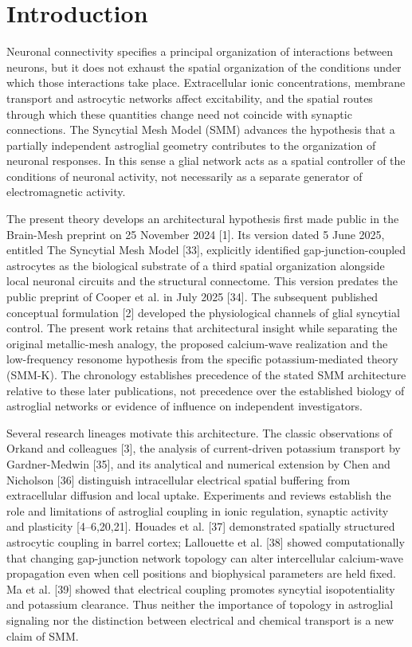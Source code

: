\documentclass[
  11pt,
]{article}
\begin{document}
\section{Introduction}\label{introduction}

Neuronal connectivity specifies a principal organization of interactions
between neurons, but it does not exhaust the spatial organization of the
conditions under which those interactions take place. Extracellular
ionic concentrations, membrane transport and astrocytic networks affect
excitability, and the spatial routes through which these quantities
change need not coincide with synaptic connections. The Syncytial Mesh
Model (SMM) advances the hypothesis that a partially independent
astroglial geometry contributes to the organization of neuronal
responses. In this sense a glial network acts as a spatial controller of
the conditions of neuronal activity, not necessarily as a separate
generator of electromagnetic activity.

The present theory develops an architectural hypothesis first made public in the Brain-Mesh preprint on 25 November 2024 {[}1{]}. Its version dated 5 June 2025, entitled The Syncytial Mesh Model {[}33{]}, explicitly identified gap-junction-coupled astrocytes as the biological substrate of a third spatial organization alongside local neuronal circuits and the structural connectome. This version predates the public preprint of Cooper et al. in July 2025 {[}34{]}. The subsequent published conceptual formulation {[}2{]} developed the physiological channels of glial syncytial control. The present work retains that architectural insight while separating the original metallic-mesh analogy, the proposed calcium-wave realization and the low-frequency resonome hypothesis from the specific potassium-mediated theory (SMM-K). The chronology establishes precedence of the stated SMM architecture relative to these later publications, not precedence over the established biology of astroglial networks or evidence of influence on independent investigators.

Several research lineages motivate this architecture. The classic observations of Orkand and colleagues {[}3{]}, the analysis of current-driven potassium transport by Gardner-Medwin {[}35{]}, and its analytical and numerical extension by Chen and Nicholson {[}36{]} distinguish intracellular electrical spatial buffering from extracellular diffusion and local uptake. Experiments and reviews establish the role and limitations of astroglial coupling in ionic regulation, synaptic activity and plasticity {[}4--6,20,21{]}. Houades et al. {[}37{]} demonstrated spatially structured astrocytic coupling in barrel cortex; Lallouette et al. {[}38{]} showed computationally that changing gap-junction network topology can alter intercellular calcium-wave propagation even when cell positions and biophysical parameters are held fixed. Ma et al. {[}39{]} showed that electrical coupling promotes syncytial isopotentiality and potassium clearance. Thus neither the importance of topology in astroglial signaling nor the distinction between electrical and chemical transport is a new claim of SMM.
\end{document}
